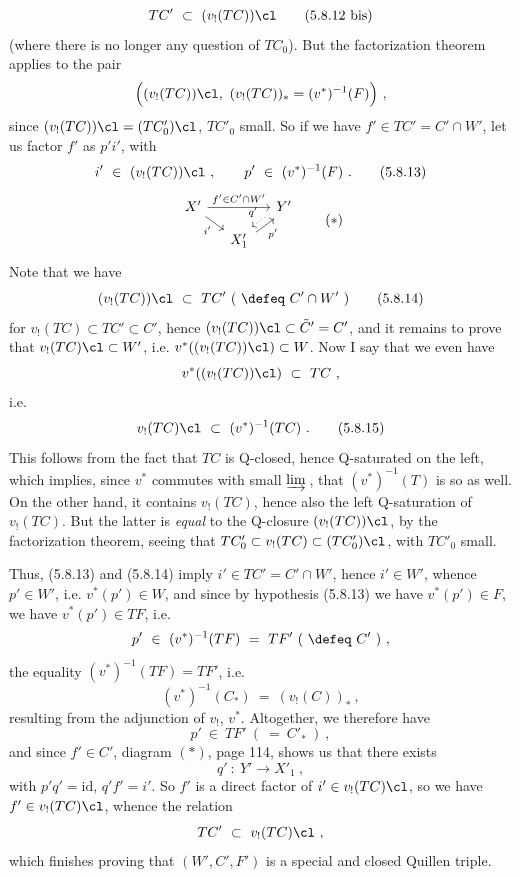 \[
TC' \ \subset \ (v_!(TC))\cl
\tag*{(5.8.12 bis)}
\]
(where there is no longer any question of $TC_0$). But the factorization theorem applies to the pair
\[
\Big( (v_!(TC))\cl,\ (v_!(TC))_* = (v^*)^{-1}(F) \Big)\ ,
\]
since $(v_!(TC))\cl = (TC'_0)\cl$, $TC'_0$ small. So if we have $f' \in TC' = C' \cap W'$, let us factor $f'$ as $p'i'$, with
\[
i' \ \in \ (v_!(TC))\cl\ , \qquad p' \ \in \ (v^*)^{-1}(F)\ .
\tag*{(5.8.13)}
\]
\[
\begin{tikzcd}[column sep=small, row sep=small]
X' \arrow[rr, "f' \in C' \cap W'"] \arrow[dr, "i'"'] & & Y' \arrow[dl, dotted, shift right, "q'"'] \\
& X'_1 \arrow[ur, shift right, "p'"'] &
\end{tikzcd}
\tag*{$(*)$}
\]
Note that we have
\[
(v_!(TC))\cl \ \subset \ TC' \ (\ \defeq \ C' \cap W'\ )
\tag*{(5.8.14)}
\]
for $v_!(TC) \subset TC' \subset C'$, hence $(v_!(TC))\cl \subset \tilde{C}' = C'$, and it remains to prove that $v_!(TC)\cl \subset W'$, i.e. $v^*((v_!(TC))\cl) \subset W$. Now I say that we even have
\[
v^*((v_!(TC))\cl) \ \subset \ TC\ ,
\]
i.e.
\[
v_!(TC)\cl \ \subset \ (v^*)^{-1}(TC)\ .
\tag*{(5.8.15)}
\]
This follows from the fact that $TC$ is Q-closed, hence Q-saturated on the left, which implies, since $v^*$ commutes with small $\varinjlim$\,, that $(v^*)^{-1}(T)$ is so as well. On the other hand, it contains $v_!(TC)$, hence also the left Q-saturation of $v_!(TC)$. But the latter is \textit{equal} to the Q-closure $(v_!(TC))\cl$, by the factorization theorem, seeing that $TC'_0 \subset v_!(TC) \subset (TC'_0)\cl$, with $TC'_0$ small. %

Thus, (5.8.13) and (5.8.14) imply $i' \in TC' = C' \cap W'$, hence $i' \in W'$, whence $p' \in W'$, i.e. $v^*(p') \in W$, and since by hypothesis
(5.8.13) we have $v^*(p') \in F$, we have $v^*(p') \in TF$, i.e.
\[
p' \ \in \ (v^*)^{-1}(TF) \ = \ TF' \ (\ \defeq \ C'\ )\ , %
\]
the equality $(v^*)^{-1}(TF) = TF'$, i.e.
\[
(v^*)^{-1}(C_*) \ = \ (v_!(C))_*\ ,
\]
resulting from the adjunction of $v_!$, $v^*$. Altogether, we therefore have
\[
p' \ \in \ TF' \ (\ = \ C'_*\ )\ ,
\tag*{(5.8.16)}
\]
and since $f' \in C'$, diagram $(*)$, page 114, shows us that there exists
\[
q' \ : \ Y' \longrightarrow X'_1\ ,
\]
with $p'q' = \mathrm{id}$, $q'f' = i'$. So $f'$ is a direct factor of $i' \in v_!(TC)\cl$, so we have $f' \in v_!(TC)\cl$, whence the relation
\[
TC' \ \subset \ v_!(TC)\cl\ ,
\]
which finishes proving that $(W', C', F')$ is a special and closed Quillen triple.

